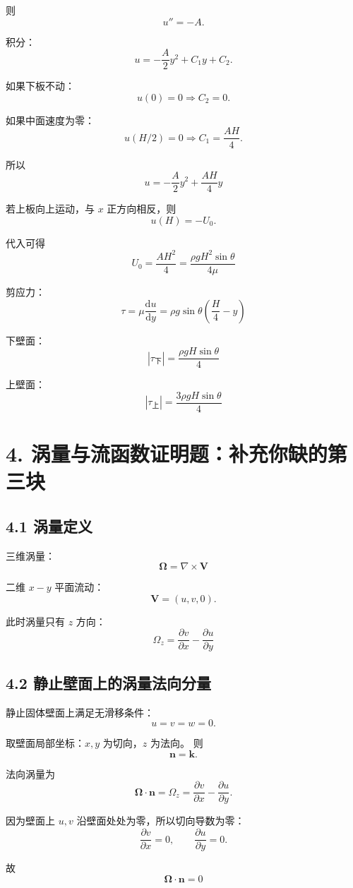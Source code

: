 ﻿\documentclass[12pt,a4paper]{ctexart}
\newcommand{\dd}{\mathrm d}
\begin{document}
则
\[
u''=-A.
\]

积分：
\[
u=-\frac{A}{2}y^2+C_1y+C_2.
\]

如果下板不动：
\[
u(0)=0\Rightarrow C_2=0.
\]

如果中面速度为零：
\[
u(H/2)=0\Rightarrow C_1=\frac{AH}{4}.
\]

所以
\[
\boxed{
u=-\frac{A}{2}y^2+\frac{AH}{4}y
}
\]

若上板向上运动，与 \(x\) 正方向相反，则
\[
u(H)=-U_0.
\]

代入可得
\[
\boxed{
U_0=\frac{AH^2}{4}
=\frac{\rho gH^2\sin\theta}{4\mu}
}
\]

剪应力：
\[
\boxed{
\tau=\mu\frac{\dd u}{\dd y}
=\rho g\sin\theta\left(\frac H4-y\right)
}
\]

下壁面：
\[
\boxed{
|\tau_{\text{下}}|
=\frac{\rho gH\sin\theta}{4}
}
\]

上壁面：
\[
\boxed{
|\tau_{\text{上}}|
=\frac{3\rho gH\sin\theta}{4}
}
\]

\section*{4. 涡量与流函数证明题：补充你缺的第三块}

\subsection*{4.1 涡量定义}

三维涡量：
\[
\boxed{
\bm\Omega=\nabla\times\bm V
}
\]

二维 \(x-y\) 平面流动：
\[
\bm V=(u,v,0).
\]

此时涡量只有 \(z\) 方向：
\[
\boxed{
\Omega_z=\frac{\partial v}{\partial x}
-\frac{\partial u}{\partial y}
}
\]

\subsection*{4.2 静止壁面上的涡量法向分量}

静止固体壁面上满足无滑移条件：
\[
u=v=w=0.
\]

取壁面局部坐标：\(x,y\) 为切向，\(z\) 为法向。
则
\[
\bm n=\bm k.
\]

法向涡量为
\[
\bm\Omega\cdot\bm n=\Omega_z
=\frac{\partial v}{\partial x}
-\frac{\partial u}{\partial y}.
\]

因为壁面上 \(u,v\) 沿壁面处处为零，所以切向导数为零：
\[
\frac{\partial v}{\partial x}=0,
\qquad
\frac{\partial u}{\partial y}=0.
\]

故
\[
\boxed{
\bm\Omega\cdot\bm n=0
}
\]
\end{document}
